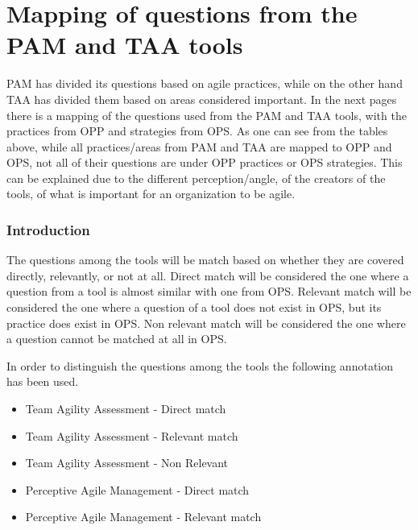 \label{table:opp_taa_practices}


\section{Mapping of questions from the PAM and TAA tools}
\label{mapping}

PAM has divided its questions based on agile practices, while on the other hand TAA has divided them based on areas considered important. In the next pages there is a mapping of the questions used from the PAM and TAA tools, with the practices from OPP and strategies from OPS. As one can see from the tables above, while all practices/areas from PAM and TAA are mapped to OPP and OPS, not all of their questions are under OPP practices or OPS strategies. This can be explained due to the different perception/angle, of the creators of the tools, of what is important for an organization to be agile.





\subsubsection{Introduction}
The questions among the tools will be match based on whether they are covered directly, relevantly, or not at all. Direct match will be considered the one where a question from a tool is almost similar with one from OPS. Relevant match will be considered the one where a question of a tool does not exist in OPS, but its practice does exist in OPS. Non relevant match will be considered the one where a question cannot be matched at all in OPS. 

\newcommand*\taa{\item[\FiveStar]}
\newcommand*\taar{\item[\FiveStarShadow]}
\newcommand*\taanr{\item[\SnowflakeChevron]}
\newcommand*\pam{\item[\AsteriskBold]}
\newcommand*\pamr{\item[\AsteriskThinCenterOpen]}

In order to distinguish the questions among the tools the following annotation has been used. 
\begin{itemize}
  \taa Team Agility Assessment - Direct match
  \taar Team Agility Assessment - Relevant match
  \taanr Team Agility Assessment - Non Relevant
  \pam Perceptive Agile Management - Direct match
  \pamr Perceptive Agile Management - Relevant match
\end{itemize}

